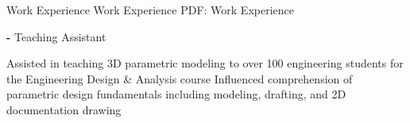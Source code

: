 \Section
{Work Experience}
{Work Experience}
{PDF: Work Experience}

\Entry
\TrinityTitle
\dotfill
\textbf{-}
\SubEntry
\Gap
Teaching Assistant
\begin{Detail}
    \SubBulletItem
    Assisted in teaching 3D parametric modeling to over 100 engineering students for the Engineering Design & Analysis course
    \SubBulletItem
    Influenced comprehension of parametric design fundamentals including modeling, drafting, and 2D documentation drawing
\end{Detail}
